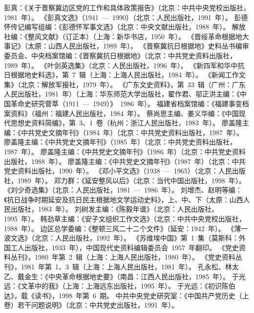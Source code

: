 \begin{thebibliography}{999}
\bibitem{}彭真：《关于晋察冀边区党的工作和具体政策报告》（北京：中共中央党校出版社，1981~年）。
\bibitem{}《彭真文选》（1941~—~1990）（北京：人民出版社，1991~年）。
\bibitem{}彭德怀传记编写组编：《彭德怀军事文选》（北京：中央文献出版社，1988~年）。
\bibitem{}解放社编：《整风文献》（订正本）（上海：新华书店，1950~年）。
\bibitem{}《晋绥革命根据地大事记》（太原：山西人民出版社，1989~年）。
\bibitem{}《晋察冀抗日根据地》史料丛书编审委员会、中央档案馆编：《晋察冀抗日根据地》（北京：中共党史资料出版社，1989~年）。
\bibitem{}《叶剑英选集》（北京：人民出版社，1996~年）。
\bibitem{}《新四军和华中抗日根据地史料选》，第~7~辑（上海：上海人民出版社，1984~年）。
\bibitem{}《新闻工作文集》（北京：解放军报社，1979~年）。
\bibitem{}《广东文史资料》，第~33~辑（广州：广东人民出版社，1981~年）（上海：华东师范大学出版社，翟作君、邬正洪主编：《中国革命史研究菅萃（1911~—~1949）》~1986~年）。
\bibitem{}福建省档案馆编：《福建事变档案资料》（福州：福建人民出版社，1984~年）。
\bibitem{}蔡尚思主编、姜义华编：《中国现代思想史资料简编》，第~3、1~卷（杭州：浙江人民出版社，1983~年）。
\bibitem{}廖盖隆主编：《中共党史文摘年刊》（1984~年）（北京：中共党史资料出版社，1987~年）。
\bibitem{}廖盖隆主编：《中共党史文摘年刊》（1985~年）（北京：中共党史资料出版社，1987~年）。
\bibitem{}廖盖隆主编：《中共党史文摘年刊》（1986~年）（北京：中共党史资料出版社，1988~年）。
\bibitem{}廖盖隆主编：《中共党史文摘年刊》（1987~年）（北京：中共党史资料出版社，1990~年）。
\bibitem{}《邓小平文选》（1938~—~1965）（北京：人民出版社，1989~年）。
\bibitem{}邓力群：《延安整风以后》（北京：当代中国出版社，1998~年）。
\bibitem{}《刘少奇选集》（北京：人民出版社，1981~—~1986~年）。
\bibitem{}刘增杰、赵明等编：《抗日战争时期延安及抗日民主根据地文学运动史料》，上、中、下（太原：山西人民出版社，1983~年）。
\bibitem{}刘树发主编：《陈毅年谱》（北京：人民出版社，1995~年）。
\bibitem{}韩劲草主编：《安子文组织工作文选》（北京：中共中央党校出版社，1988~年）。
\bibitem{}边区总学委编：《整顿三风二十二个文件》（延安：1942~年）。
\bibitem{}《薄一波文选》（北京：人民出版社，1992~年）。
\bibitem{}《苏维埃中国》第~1~集（莫斯科：外国工人出版社，1933~年），中国现代史资料编辑委员会~1957~年翻印。
\bibitem{}《党史资料丛刊》，1980~年第~2~辑（上海：上海人民出版社，1980~年）。
\bibitem{}《党史资料丛刊》，1981~年第~1、3~辑（上海：上海人民出版社，1981~年）。
\bibitem{}孔永松、林太乙、戴金生：《中央革命根据地史要》（南昌：江西人民出版社，1985~年）。
\bibitem{}于光远：《文革中的我》（上海：上海远东出版社，1995~年）。
\bibitem{}于光远：《初识陈伯达》，载《读书》，1998~年第~6~期。
\bibitem{}中共中央党史研究室：《中国共产党历史（上卷）若干问题说明》（北京：中共党史出版社，1991~年）。

\end{thebibliography}
